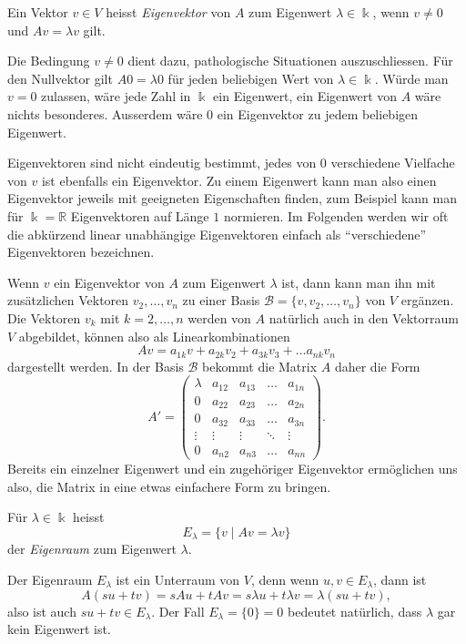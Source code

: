 \begin{definition}
Ein Vektor $v\in V$ heisst {\em Eigenvektor} von $A$ zum Eigenwert
$\lambda\in\Bbbk$, wenn $v\ne 0$ und $Av=\lambda v$ gilt.
\end{definition}

Die Bedingung $v\ne 0$ dient dazu, pathologische Situationen auszuschliessen.
Für den Nullvektor gilt $A0=\lambda 0$ für jeden beliebigen Wert von
$\lambda\in\Bbbk$.
Würde man $v=0$ zulassen, wäre jede Zahl in $\Bbbk$ ein Eigenwert,
ein Eigenwert von $A$ wäre nichts besonderes.
Ausserdem wäre $0$ ein Eigenvektor zu jedem beliebigen Eigenwert.

Eigenvektoren sind nicht eindeutig bestimmt, jedes von $0$ verschiedene
Vielfache von $v$ ist ebenfalls ein Eigenvektor.
Zu einem Eigenwert kann man also einen Eigenvektor jeweils mit 
geeigneten Eigenschaften finden, zum Beispiel kann man für $\Bbbk = \mathbb{R}$
Eigenvektoren auf Länge $1$ normieren.
Im Folgenden werden wir oft die abkürzend linear unabhängige Eigenvektoren
einfach als ``verschiedene'' Eigenvektoren bezeichnen.

Wenn $v$ ein Eigenvektor von $A$ zum Eigenwert $\lambda$ ist, dann kann
man ihn mit zusätzlichen Vektoren $v_2,\dots,v_n$ zu einer Basis
$\mathcal{B}=\{v,v_2,\dots,v_n\}$
von $V$ ergänzen.
Die Vektoren $v_k$ mit $k=2,\dots,n$ werden von $A$ natürlich auch
in den Vektorraum $V$ abgebildet, können also als Linearkombinationen
\[
Av = a_{1k}v + a_{2k}v_2 + a_{3k}v_3 + \dots a_{nk}v_n
\]
dargestellt werden.
In der Basis $\mathcal{B}$ bekommt die Matrix $A$ daher die Form
\[
A'
=
\begin{pmatrix}
\lambda&a_{12}&a_{13}&\dots &a_{1n}\\
    0  &a_{22}&a_{23}&\dots &a_{2n}\\
    0  &a_{32}&a_{33}&\dots &a_{3n}\\
\vdots &\vdots&\vdots&\ddots&\vdots\\
    0  &a_{n2}&a_{n3}&\dots &a_{nn}
\end{pmatrix}.
\]
Bereits ein einzelner Eigenwert und ein zugehöriger Eigenvektor
ermöglichen uns also, die Matrix in eine etwas einfachere Form
zu bringen.

\begin{definition}
Für $\lambda\in\Bbbk$ heisst
\[
E_\lambda
=
\{ v\;|\; Av=\lambda v\}
\]
der {\em Eigenraum} zum Eigenwert $\lambda$.
%
\end{definition}

Der Eigenraum $E_\lambda$ ist ein Unterraum von $V$, denn wenn
$u,v\in E_\lambda$, dann ist
\[
A(su+tv)
=
sAu+tAv
=
s\lambda u + t\lambda v
=
\lambda(su+tv),
\]
also ist auch $su+tv\in E_\lambda$.
Der Fall $E_\lambda = \{0\}=0$ bedeutet natürlich, dass $\lambda$ gar kein
Eigenwert ist.

